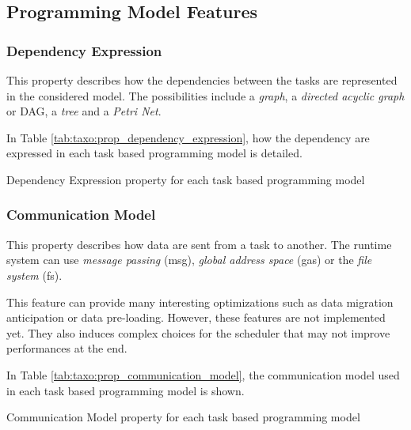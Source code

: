 \subsection{Programming Model Features}
\subsubsection{Dependency Expression}
This property describes how the dependencies between the tasks are represented in the considered model.
The possibilities include a \textit{graph}, a \textit{directed acyclic graph} or DAG, a \textit{tree} and a \textit{Petri Net}.

In Table \ref{tab:taxo:prop_dependency_expression}, how the dependency are expressed in each task based programming model is detailed.
\begin{table}[H]
	\caption{Dependency Expression property for each task based programming model \label{tab:taxo:prop_dependency_expression}}
	\centering
	\begin{multicols}{2}
		

		
	\end{multicols}
\end{table}


\subsubsection{Communication Model}
This property describes how data are sent from a task to another.
The runtime system can use \textit{message passing} (msg), \textit{global address space} (gas) or the \textit{file system} (fs).

This feature can provide many interesting optimizations such as data migration anticipation or data pre-loading.
However, these features are not implemented yet.
They also induces complex choices for the scheduler that may not improve performances at the end.

In Table \ref{tab:taxo:prop_communication_model}, the communication model used in each task based programming model is shown.
\begin{table}[H]
	\caption{Communication Model property for each task based programming model \label{tab:taxo:prop_communication_model}}
	\centering
	\begin{multicols}{2}
		

		
	\end{multicols}
\end{table}

